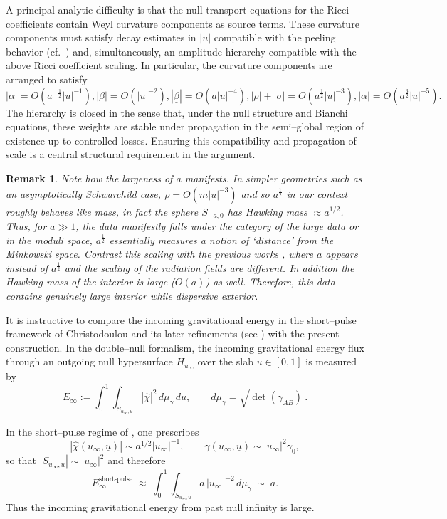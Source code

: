 \documentclass{amsart}
\newtheorem{remark}{Remark}
\newcommand{\ubar}{\underline{u}}
\begin{document}
\noindent A principal analytic difficulty is that the null transport equations for the Ricci coefficients contain Weyl curvature components as source terms. These curvature components must satisfy decay estimates in $|u|$ compatible with the peeling behavior (cf.\ \cite{nicolo}) and, simultaneously, an amplitude hierarchy compatible with the above Ricci coefficient scaling. In particular, the curvature components are arranged to satisfy
\[
|\alpha|=O\!\left(a^{-\frac12}|u|^{-1}\right),
|\beta|=O\!\left(|u|^{-2}\right),
|\underline\beta|=O\!\left(a|u|^{-4}\right),
|\rho|+|\sigma|=O\!\left(a^{\frac12}|u|^{-3}\right),
|\underline\alpha|=O\!\left(a^{\frac32}|u|^{-5}\right).
\]
The hierarchy is closed in the sense that, under the null structure and Bianchi equations, these weights are stable under propagation in the semi–global region of existence up to controlled losses. Ensuring this compatibility and propagation of scale is a central structural requirement in the argument.

\begin{remark}
Note how the largeness of $a$ manifests. In simpler geometries such as an asymptotically Schwarchild case, $\rho=O(m|u|^{-3})$ and so $a^{\frac{1}{2}}$ in our context roughly behaves like mass, in fact the sphere $S_{-a,0}$ has Hawking mass $\approx a^{1/2}$. Thus, for $a\gg1$, the data manifestly falls under the category of the large data or in the moduli space, $a^{\frac{1}{2}}$ essentially measures a notion of `distance' from the Minkowski space. Contrast this scaling with the previous works \cite{An,AnAth,NMY1}, where $a$ appears instead of $a^{\frac{1}{2}}$ and the scaling of the radiation fields are different. In addition the Hawking mass of the interior is large ($O(a)$) as well. Therefore, this data contains genuinely large interior while dispersive exterior.     
\end{remark}

\noindent It is instructive to compare the incoming gravitational energy in the short–pulse framework of Christodoulou and its later refinements (see \cite{christodoulou,An,AnAth}) with the present construction. In the double–null formalism, the incoming gravitational energy flux through an outgoing null hypersurface $H_{u_\infty}$ over the slab $\ubar\in[0,1]$ is measured by
\[
E_\infty
:=
\int_{0}^{1}\!\int_{S_{u_\infty,\ubar}}
|\hat\chi|^{2}\, d\mu_{\gamma}\, d\ubar,
\qquad
d\mu_{\gamma}=\sqrt{\det(\gamma_{AB})}\,.
\]

\noindent In the short–pulse regime of \cite{An,AnAth}, one prescribes
\[
|\hat\chi(u_\infty,\ubar)|\sim a^{1/2}|u_\infty|^{-1},
\qquad
\gamma(u_\infty,\ubar)\sim |u_\infty|^{2}\gamma_{0},
\]
so that $|S_{u_\infty,\ubar}|\sim |u_\infty|^{2}$ and therefore
\[
E_\infty^{\mathrm{short\text{-}pulse}}
\;\approx\;
\int_{0}^{1}\!\int_{S_{u_\infty,\ubar}}
a\,|u_\infty|^{-2}\, d\mu_{\gamma}
\;\sim\;
a.
\]
Thus the incoming gravitational energy from past null infinity is large.
\end{document}
